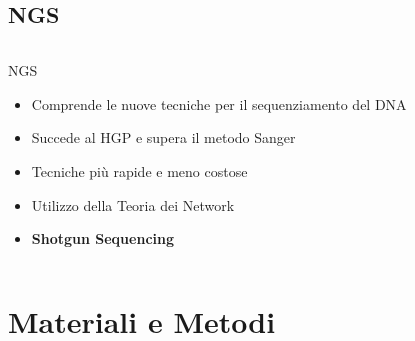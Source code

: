 \documentclass{beamer}
\begin{document}
\subsection{NGS}
\begin{frame}
\begin{columns}
\begin{column}{0.8\linewidth}
\begin{block}{NGS}
\begin{itemize}
\small
\item Comprende le nuove tecniche per il sequenziamento del 
DNA
\item Succede al HGP e supera il metodo Sanger
\item Tecniche più rapide e meno costose
\item Utilizzo della Teoria dei Network
\item \textbf{Shotgun Sequencing}
\end{itemize}
\end{block}
\end{column}
\end{columns}
\end{frame}


\section{Materiali e Metodi}
\end{document}
